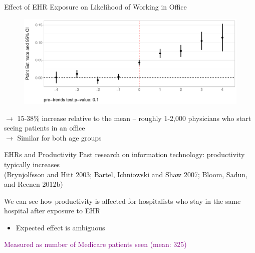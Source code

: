 \documentclass[notes,11pt, aspectratio=169]{beamer}
\begin{document}
\begin{frame}{Effect of EHR Exposure on Likelihood of Working in Office}
\label{Effect of EHR Exposure on Likelihood of Working in Office}
\begin{figure}[ht]
    \centering
    \includegraphics[scale=.5]{Objects/officeind_plot_all.pdf}
\end{figure}
$\rightarrow$ 15-38\% increase relative to the mean -- roughly 1-2,000 physicians who start seeing patients in an office\\
$\rightarrow$ Similar for both age groups

\hyperlink{Robustness: Indicator for Working in Office}{}
\end{frame}



\begin{frame}{EHRs and Productivity}
Past research on information technology: productivity typically increases \\ \scriptsize (Brynjolfsson and Hitt 2003; Bartel, Ichniowski and Shaw 2007; Bloom, Sadun, and Reenen 2012b)
                \vspace{6mm}
                \normalsize 
                
We can see how productivity is affected for hospitalists who stay in the same hospital after exposure to EHR
                \vspace{3mm}
\begin{itemize}
    \item Expected effect is ambiguous
\end{itemize}

\vspace{5mm}
\textcolor{purple}{Measured as number of Medicare patients seen (mean: 325)}
\end{frame}
\end{document}

